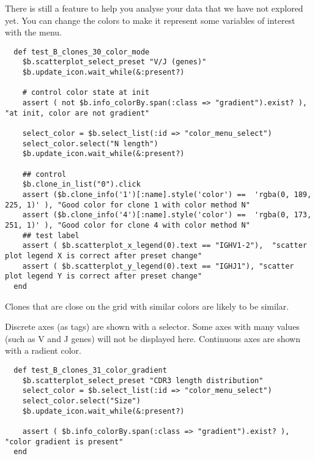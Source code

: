 There is still a feature to help you analyse your data that we have not
explored yet.
You can change the colors to make it represent some variables of interest
with the  menu.
\begin{verbatim}
  def test_B_clones_30_color_mode
    $b.scatterplot_select_preset "V/J (genes)"
    $b.update_icon.wait_while(&:present?)

    # control color state at init
    assert ( not $b.info_colorBy.span(:class => "gradient").exist? ), "at init, color are not gradient"

    select_color = $b.select_list(:id => "color_menu_select")
    select_color.select("N length")
    $b.update_icon.wait_while(&:present?)
    
    ## control
    $b.clone_in_list("0").click
    assert ($b.clone_info('1')[:name].style('color') ==  'rgba(0, 189, 225, 1)' ), "Good color for clone 1 with color method N"
    assert ($b.clone_info('4')[:name].style('color') ==  'rgba(0, 173, 251, 1)' ), "Good color for clone 4 with color method N"
    ## test label
    assert ( $b.scatterplot_x_legend(0).text == "IGHV1-2"),  "scatter plot legend X is correct after preset change"
    assert ( $b.scatterplot_y_legend(0).text == "IGHJ1"), "scatter plot legend Y is correct after preset change"
  end
\end{verbatim}
  
Clones that are close on the grid with similar colors are likely to
be similar.

Discrete axes (as tags) are shown with a selector.
Some axes with many values (such as V and J genes) will not be displayed here.
Continuous axes are shown with a radient color.
\begin{verbatim}
  def test_B_clones_31_color_gradient
    $b.scatterplot_select_preset "CDR3 length distribution"
    select_color = $b.select_list(:id => "color_menu_select")
    select_color.select("Size")
    $b.update_icon.wait_while(&:present?)

    assert ( $b.info_colorBy.span(:class => "gradient").exist? ), "color gradient is present"
  end
\end{verbatim}

